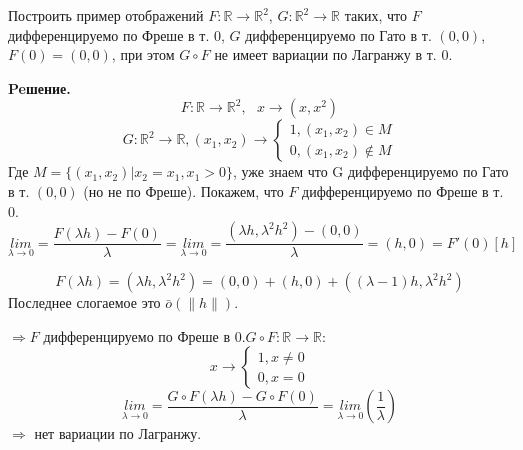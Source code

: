 \begin{task}
    Построить пример отображений $F:\mathbb{R}\rightarrow \mathbb{R}^2$, $G:\mathbb{R}^2\rightarrow \mathbb{R}$ таких, что $F$ дифференцируемо по Фреше в т. $0$, $G$ дифференцируемо по Гато в т. $(0,0)$, $F(0)=(0,0)$, при этом $G \circ F$ не имеет вариации по Лагранжу в т. 0.
    
    \textbf{Peшение.} 
    $$F:\mathbb{R}\rightarrow \mathbb{R}^2, \ \ \ x \rightarrow (x,x^2)$$
    \begin{equation*}
    G:\mathbb{R}^2\rightarrow \mathbb{R}, (x_1,x_2)\rightarrow
    \begin{cases}
        1, (x_1,x_2)\in M \\0, (x_1,x_2)\notin M
    \end{cases}
    \end{equation*}
    Где $M=\{ (x_1,x_2)|x_2=x_1,x_1>0\}$, уже знаем что G дифференцируемо по Гато в т. $(0,0)$ (но не по Фреше). Покажем, что $F$ дифференцируемо по Фреше в т. 0.
    $$\underset{\lambda \rightarrow 0}{lim}=\frac{F(\lambda h)-F (0)}{\lambda} 
        = \underset{\lambda\rightarrow0}{lim}=\frac{(\lambda h,\lambda^2 h^2)-(0,0)}{\lambda}=(h,0)=F'(0)[h]$$
    
    $$ F(\lambda h)=(\lambda h,\lambda^2 h^2)=(0,0)+(h,0)+((\lambda-1)h,\lambda^2 h^2) $$
    Последнее слогаемое это $\bar{o}(\|h \|)$.
    
    \noindent $\Rightarrow F$ дифференцируемо по Фреше в 0.$G \circ F:\mathbb{R}\rightarrow\mathbb{R}$:
     \begin{equation*}
    x\rightarrow
    \begin{cases}
        1, x\neq0\\0, x=0
    \end{cases}
    \end{equation*}
    $$\underset{\lambda\rightarrow0}{lim}=\frac{G \circ F(\lambda h)-G \circ F(0)}{\lambda}=\underset{\lambda\rightarrow0}{lim} \left( \frac{1}{\lambda} \right) $$
    $\Rightarrow$ нет вариации по Лагранжу.
    \end{task}